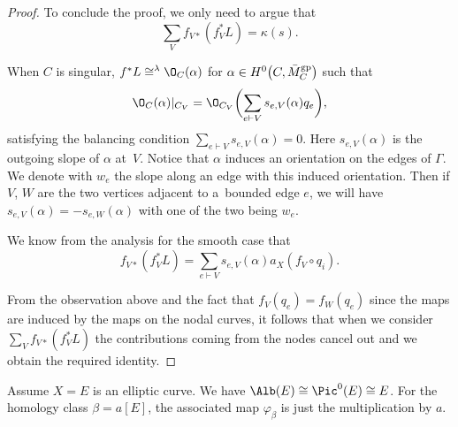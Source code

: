 \begin{proof}
To conclude the proof, we only need to argue that
\[ \sum_V f_{V\ast}(f_V^*L)=\kappa(s).\]

When $C$ is singular, $f^*L\cong^{\lambda}\O_C(\alpha)$ for $\alpha\in H^0\bigl(C, \bar{M}_C^{\rm gp}\bigr)$ such that
\[\O_C(\alpha)\rvert_{C_V}=\O_{C_V}\biggl(\sum_{e\vdash V}s_{e,V}(\alpha)q_e\biggr),\]
satisfying the balancing condition $\sum_{e\vdash V}s_{e,V}(\alpha)=0$. Here $s_{e,V}(\alpha)$ is the outgoing slope of $\alpha$ at~$V$. Notice that $\alpha$ induces an orientation on the edges of $\Gamma$. We denote with $w_e$ the slope along an edge with this induced orientation. Then if $V$, $W$ are the two vertices adjacent to a~bounded edge $e$, we will have $s_{e,V}(\alpha)=-s_{e,W}(\alpha)$ with one of the two being $w_e$.

 We know from the analysis for the smooth case that
 \[f_{V\ast}(f_V^*L)=\sum_{e\vdash V}s_{e,V}(\alpha) a_X(f_V\circ q_i).\]

 From the observation above and the fact that $f_V(q_e)=f_W(q_e)$ since the maps are induced by the maps on the nodal curves, it follows that when we consider $\sum_Vf_{V\ast}(f_V^*L)$ the contributions coming from the nodes cancel out and we obtain the required identity.
\end{proof}

\begin{expl}
 Assume $X=E$ is an elliptic curve. We have $\Alb(E)\cong\Pic^0(E)\cong E$. For the homology class $\beta=a[E]$, the associated map $\varphi_\beta$ is just the multiplication by $a$.
\end{expl}

